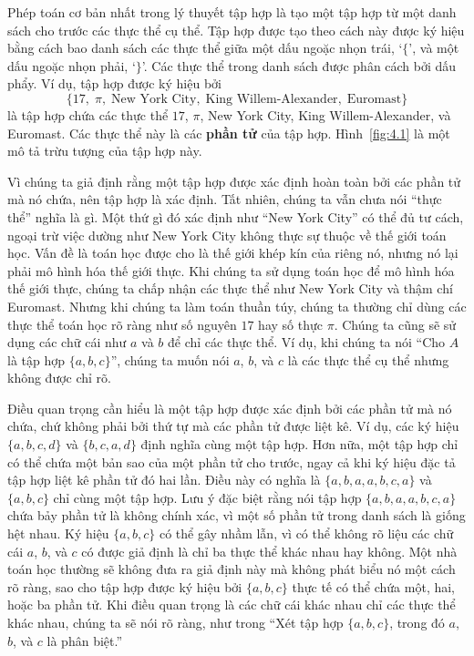 Phép toán cơ bản nhất trong lý thuyết tập hợp là tạo một tập hợp từ một danh sách cho trước các thực thể cụ thể. Tập hợp được tạo theo cách này được ký hiệu bằng cách bao danh sách các thực thể giữa một dấu ngoặc nhọn trái, `$\{$', và một dấu ngoặc nhọn phải, `$\}$'. Các thực thể trong danh sách được phân cách bởi dấu phẩy. Ví dụ, tập hợp được ký hiệu bởi
\[
\{ 17,\; \pi,\; \text{New York City},\; \text{King Willem-Alexander},\; \text{Euromast} \}
\]
là tập hợp chứa các thực thể $17$, $\pi$, New York City, King Willem-Alexander, và Euromast. Các thực thể này là các \textbf{phần tử} của tập hợp. Hình~\ref{fig:4.1} là một mô tả trừu tượng của tập hợp này.

Vì chúng ta giả định rằng một tập hợp được xác định hoàn toàn bởi các phần tử mà nó chứa, nên tập hợp là xác định. Tất nhiên, chúng ta vẫn chưa nói ``thực thể'' nghĩa là gì. Một thứ gì đó xác định như ``New York City'' có thể đủ tư cách, ngoại trừ việc dường như New York City không thực sự thuộc về thế giới toán học. Vấn đề là toán học được cho là thế giới khép kín của riêng nó, nhưng nó lại phải mô hình hóa thế giới thực. Khi chúng ta sử dụng toán học để mô hình hóa thế giới thực, chúng ta chấp nhận các thực thể như New York City và thậm chí Euromast. Nhưng khi chúng ta làm toán thuần túy, chúng ta thường chỉ dùng các thực thể toán học rõ ràng như số nguyên $17$ hay số thực $\pi$. Chúng ta cũng sẽ sử dụng các chữ cái như $a$ và $b$ để chỉ các thực thể. Ví dụ, khi chúng ta nói ``Cho $A$ là tập hợp $\{a, b, c\}$'', chúng ta muốn nói $a$, $b$, và $c$ là các thực thể cụ thể nhưng không được chỉ rõ.

\begin{warningbox}
Điều quan trọng cần hiểu là một tập hợp được xác định bởi các phần tử mà nó chứa, chứ không phải bởi thứ tự mà các phần tử được liệt kê. Ví dụ, các ký hiệu $\{a, b, c, d\}$ và $\{b, c, a, d\}$ định nghĩa cùng một tập hợp. Hơn nữa, một tập hợp chỉ có thể chứa một bản sao của một phần tử cho trước, ngay cả khi ký hiệu đặc tả tập hợp liệt kê phần tử đó hai lần. Điều này có nghĩa là $\{a, b, a, a, b, c, a\}$ và $\{a, b, c\}$ chỉ cùng một tập hợp. Lưu ý đặc biệt rằng nói tập hợp $\{a, b, a, a, b, c, a\}$ chứa bảy phần tử là không chính xác, vì một số phần tử trong danh sách là giống hệt nhau. Ký hiệu $\{a, b, c\}$ có thể gây nhầm lẫn, vì có thể không rõ liệu các chữ cái $a$, $b$, và $c$ có được giả định là chỉ ba thực thể khác nhau hay không. Một nhà toán học thường sẽ không đưa ra giả định này mà không phát biểu nó một cách rõ ràng, sao cho tập hợp được ký hiệu bởi $\{a, b, c\}$ thực tế có thể chứa một, hai, hoặc ba phần tử. Khi điều quan trọng là các chữ cái khác nhau chỉ các thực thể khác nhau, chúng ta sẽ nói rõ ràng, như trong ``Xét tập hợp $\{a, b, c\}$, trong đó $a$, $b$, và $c$ là phân biệt.''
\end{warningbox}

